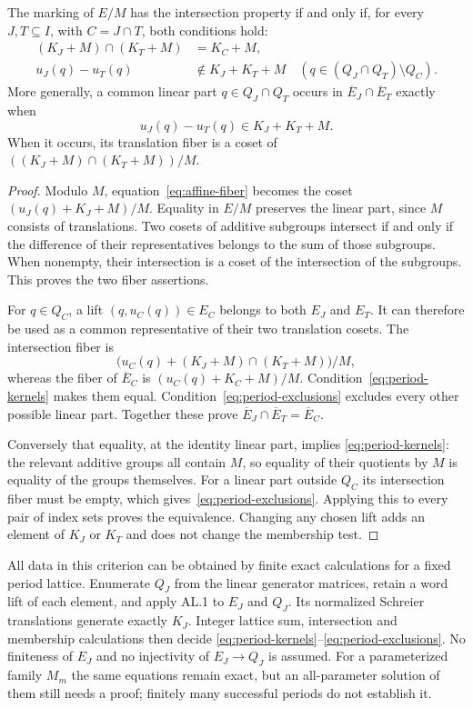 \begin{theorem}[AA.ParabolicPeriods]\label{thm:all-periods}
The marking of $E/M$ has the intersection property if and only if, for
every $J,T\subseteq I$, with $C=J\cap T$, both conditions hold:
\begin{align}
 (K_J+M)\cap(K_T+M)&=K_C+M,\label{eq:period-kernels}\\
 u_J(q)-u_T(q)&\notin K_J+K_T+M
 \quad(q\in(Q_J\cap Q_T)\setminus Q_C).\label{eq:period-exclusions}
\end{align}
More generally, a common linear part $q\in Q_J\cap Q_T$ occurs in
$\overline E_J\cap\overline E_T$ exactly when
\[
 u_J(q)-u_T(q)\in K_J+K_T+M.
\]
When it occurs, its translation fiber is a coset of
$((K_J+M)\cap(K_T+M))/M$.
\end{theorem}
\begin{proof}
Modulo $M$, equation~\eqref{eq:affine-fiber} becomes the coset
$(u_J(q)+K_J+M)/M$. Equality in $E/M$ preserves the linear part, since
$M$ consists of translations. Two cosets of additive subgroups intersect
if and only if the difference of their representatives belongs to the sum
of those subgroups. When nonempty, their intersection is a coset of the
intersection of the subgroups. This proves the two fiber assertions.

For $q\in Q_C$, a lift $(q,u_C(q))\in E_C$ belongs to both $E_J$ and
$E_T$. It can therefore be used as a common representative of their two
translation cosets. The intersection fiber is
\[
 \bigl(u_C(q)+(K_J+M)\cap(K_T+M)\bigr)/M,
\]
whereas the fiber of $\overline E_C$ is
$(u_C(q)+K_C+M)/M$. Condition~\eqref{eq:period-kernels} makes them equal.
Condition~\eqref{eq:period-exclusions} excludes every other possible linear
part. Together these prove
$\overline E_J\cap\overline E_T=\overline E_C$.

Conversely that equality, at the identity linear part, implies
\eqref{eq:period-kernels}: the relevant additive groups all contain $M$, so
equality of their quotients by $M$ is equality of the groups themselves.
For a linear part outside $Q_C$ its intersection fiber must be empty,
which gives~\eqref{eq:period-exclusions}. Applying this to every pair of
index sets proves the equivalence. Changing any chosen lift adds an element
of $K_J$ or $K_T$ and does not change the membership test.
\end{proof}

All data in this criterion can be obtained by finite exact calculations
for a fixed period lattice. Enumerate $Q_J$ from the linear generator
matrices, retain a word lift of each element, and apply AL.1 to $E_J$ and
$Q_J$. Its normalized Schreier translations generate exactly $K_J$.
Integer lattice sum, intersection and membership calculations then decide
\eqref{eq:period-kernels}--\eqref{eq:period-exclusions}. No finiteness of
$E_J$ and no injectivity of $E_J\to Q_J$ is assumed. For a parameterized
family $M_m$ the same equations remain exact, but an all-parameter solution
of them still needs a proof; finitely many successful periods do not
establish it.


